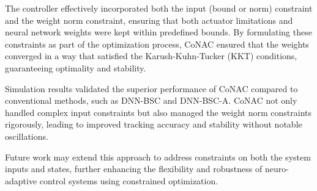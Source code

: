 \documentclass[lettersize,journal]{IEEEtran}
\begin{document}
The controller effectively incorporated both the input (bound or norm) constraint and the weight norm constraint, ensuring that both actuator limitations and neural network weights were kept within predefined bounds. By formulating these constraints as part of the optimization process, CoNAC ensured that the weights converged in a way that satisfied the Karush-Kuhn-Tucker (KKT) conditions, guaranteeing optimality and stability.

Simulation results validated the superior performance of CoNAC compared to conventional methods, such as DNN-BSC and DNN-BSC-A. CoNAC not only handled complex input constraints but also managed the weight norm constraints rigorously, leading to improved tracking accuracy and stability without notable oscillations.

Future work may extend this approach to address constraints on both the system inputs and states, further enhancing the flexibility and robustness of neuro-adaptive control systems using constrained optimization.
 
\end{document}

